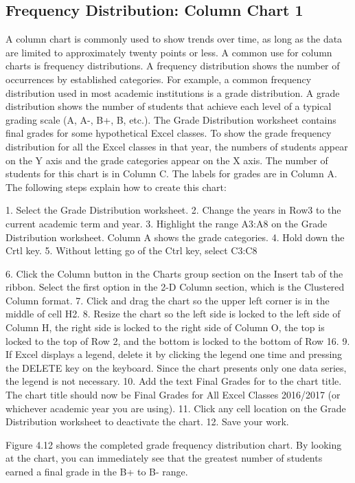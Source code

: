 \subsection{Frequency Distribution: Column Chart 1}

A column chart is commonly used to show trends over time, as long as the data are limited to
approximately twenty points or less. A common use for column charts is frequency distributions. A
frequency distribution shows the number of occurrences by established categories. For example, a
common frequency distribution used in most academic institutions is a grade distribution. A grade
distribution shows the number of students that achieve each level of a typical grading scale (A, A-, B+,
B, etc.). The Grade Distribution worksheet contains final grades for some hypothetical Excel classes.
To show the grade frequency distribution for all the Excel classes in that year, the numbers of students
appear on the Y axis and the grade categories appear on the X axis. The number of students for this
chart is in Column C. The labels for grades are in Column A. The following steps explain how to
create this chart:

1. Select the Grade Distribution worksheet.
2. Change the years in Row3 to the current academic term and year.
3. Highlight the range A3:A8 on the Grade Distribution worksheet. Column A shows the grade
categories.
4. Hold down the Crtl key.
5. Without letting go of the Ctrl key, select C3:C8


6. Click the Column button in the Charts group section on the Insert tab of the ribbon. Select the
first option in the 2-D Column section, which is the Clustered Column format.
7. Click and drag the chart so the upper left corner is in the middle of cell H2.
8. Resize the chart so the left side is locked to the left side of Column H, the right side is locked to
the right side of Column O, the top is locked to the top of Row 2, and the bottom is locked to the
bottom of Row 16.
9. If Excel displays a legend, delete it by clicking the legend one time and pressing the DELETE key
on the keyboard. Since the chart presents only one data series, the legend is not necessary.
10. Add the text Final Grades for to the chart title. The chart title should now be Final Grades for
All Excel Classes 2016/2017 (or whichever academic year you are using).
11. Click any cell location on the Grade Distribution worksheet to deactivate the chart.
12. Save your work.

Figure 4.12 shows the completed grade frequency distribution chart. By looking at the chart, you can
immediately see that the greatest number of students earned a final grade in the B+ to B- range.


